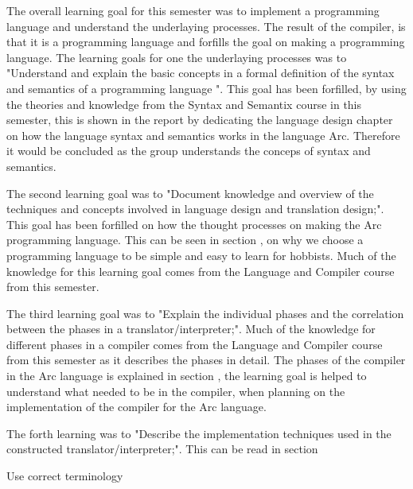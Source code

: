 The overall learning goal for this semester was to implement a programming language and understand the underlaying processes. The result of the compiler, is that it is a programming language and forfills the goal on making a programming language. The learning goals for one the underlaying processes was to "Understand and explain the basic concepts in a formal definition of the syntax and semantics of a programming language ". This goal has been forfilled, by using the theories and knowledge from the Syntax and Semantix course in this semester, this is shown in the report by dedicating the language design chapter on how the language syntax and semantics works in the language Arc. Therefore it would be concluded as the group understands the conceps of syntax and semantics.

The second learning goal was to "Document knowledge and overview of the techniques and concepts involved in language design and translation design;". This goal has been forfilled on how the thought processes on making the Arc programming language. This can be seen in section , on why we choose a programming language to be simple and easy to learn for hobbists. Much of the knowledge for this learning goal comes from the Language and Compiler course from this semester. 
 
The third learning goal was to "Explain the individual phases and the correlation between the phases in a translator/interpreter;". Much of the knowledge for different phases in a compiler comes from the Language and Compiler course from this semester as it describes the phases in detail. The phases of the compiler in the Arc language is explained in section , the learning goal is helped to understand what needed to be in the compiler, when planning on the implementation of the compiler for the Arc language. 
 
The forth learning was to "Describe the implementation techniques used in the constructed translator/interpreter;". This can be read in section   
 
Use correct terminology
